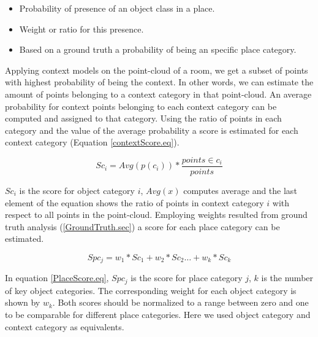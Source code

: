 \begin{itemize}
 \item Probability of presence of an object class in a place.
 \item Weight or ratio for this presence.
 \item Based on a ground truth a probability of being an specific place category.
\end{itemize}

Applying context models on the point-cloud of a room, we get a subset of points with highest probability of being 
the context. 
In other words, we can estimate the amount of points belonging to a context category in that point-cloud.
An average probability for context points belonging to each context category can be computed and assigned to that category.
Using the ratio of points in each category and the value of the average probability a score is estimated for each context
category (Equation \ref{contextScore.eq}).

\begin{equation}
 \label{contextScore.eq}
Sc_i = Avg(p(c_i)) * \frac{points \in c_i}{points} 
\end{equation}

$Sc_i$ is the score for object category $i$, $Avg(x)$ computes average and the last element of the equation shows the ratio
of points in context category $i$ with respect to all points in the point-cloud. 
Employing weights resulted from ground truth analysis (\ref{GroundTruth.sec}) a score for each place category can be 
estimated.

\begin{equation}
 \label{PlaceScore.eq}
 Spc_j = w_1 * Sc_1 + w_2 * Sc_2 \ldots + w_k * Sc_k
\end{equation}

In equation \ref{PlaceScore.eq}, $Spc_j$ is the score for place category $j$, $k$ is the number of key object categories.
The corresponding weight for each object category is shown by $w_k$. 
Both scores should be normalized to a range between zero and one to be comparable for different place categories. 
Here we used object category and context category as equivalents. 





